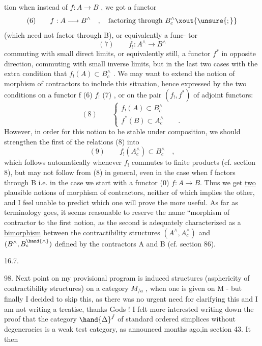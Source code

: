 
tion when instead of $f\colon A \to B$ , we got a functor
\[ (6) \qquad f : A \longrightarrow B^{\wedge} \quad , \quad \text{factoring through } B^{\wedge}_{c} \xout{\unsure{;}} \]
 (which need not factor through B), or equivalently a func-%
tor
\[ (7) \qquad f_{!} : A^{\wedge} \longrightarrow B^{\wedge} \]
commuting with small direct limits, or equivalently still, a functor
$f^{*}$ in opposite direction, commuting with small inverse limits, but
in the last two cases with the extra condition that $f_{!}(A) \subset B^{\wedge}_{c}$ . We
may want to extend the notion of morphism of contractors to include
this situation, hence expressed by the two  conditions on a functor
f (6)  $f_{!}$ (7) \xout{\unsure{,}}, or on the pair $(f_{!},f^{*})$ of adjoint functors:
\[ (8) \qquad \begin{cases} f_{!}(A) \subset B^{\wedge}_{c} \\ f^{*}(B) \subset A^{\wedge}_{c} \qquad . \end{cases} \]
However, in order for this notion to be stable under composition,
we should strengthen the first of the relations (8) into
\[ (9) \qquad f_{!}(A^{\wedge}_{c}) \subset B^{\wedge}_{c} \quad , \]
which follows automatically whenever $f_{!}$ commutes to finite products
(cf. section 8), but may not follow from (8) in general, even in
the case when f factors through B i.e. in the case we start with a
functor (0) $f\colon A \longrightarrow B$. Thus we get \uline{two} plausible notions of  morphism
of contractors, neither of which implies the other, and I feel unable
to predict which one will prove the more useful. As far as terminology
goes, it seems reasonable to reserve the name ``morphism of contractor
to the first notion, as the second is adequately characterized as a
\uline{bimorphism} between the contractibility structures $(A^{\wedge},A^{\wedge}_{c})$ and $(B^{\wedge},B^{\hand{\wedge}}_{c})$
defined by the contractors A and B\xout{\unsure{,}} (cf. section 86).

16.7.

98. Next point on my provisional program is induced structures
(asphericity of contractibility structures) on a category $M_{/a}$ , when
one is given on M - but finally I decided to skip this, as there was
no urgent need for clarifying this and I am not writing a treatise,
thanks Gods ! I felt more interested writing down the proof that the
category $\hand{\Delta}^{f}$ of standard ordered simplices without degeneracies is a
weak test category, as announced months ago,in section 43. It then

